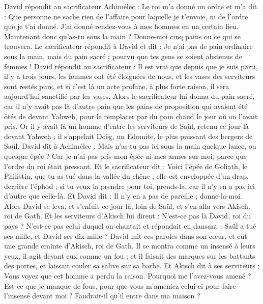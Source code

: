 \begin{multicols}{2}
David répondit au sacrificateur Achimélec : Le roi m'a donné un ordre et m'a dit : Que personne ne sache rien de l'affaire pour laquelle je t'envoie, ni de l’ordre que je t'ai donné. J’ai donné rendez-vous à mes hommes en un certain lieu.
Maintenant donc qu'as-tu sous la main ? Donne-moi cinq pains ou ce qui se trouvera.
Le sacrificateur répondit à David et dit : Je n'ai pas de pain ordinaire sous la main, mais du pain sacré ; pourvu que tes gens se soient abstenus de femmes !
David répondit au sacrificateur : Il est vrai que depuis que je suis parti, il y a trois jours, les femmes ont été éloignées de nous, et les vases des serviteurs sont restés purs, et si c’est là un acte profane, à plus forte raison, il sera aujourd’hui sanctifié par les vases.
Alors le sacrificateur lui donna du pain sacré, car il n'y avait pas là d'autre pain que les pains de proposition qui avaient été ôtés de devant Yahweh, pour le remplacer par du pain chaud le jour où on l’avait pris.
Or il y avait là un homme d'entre les serviteurs de Saül, retenu ce jour-là devant Yahweh ; il s’appelait Doëg, un Edomite, le plus puissant des bergers de Saül.
David dit à Achimélec : Mais n'as-tu pas ici sous la main quelque lance, ou quelque épée ? Car je n’ai pas pris mon épée ni mes armes sur moi, parce que l’ordre du roi était pressant.
Et le sacrificateur dit : Voici l'épée de Goliath, le Philistin, que tu as tué dans la vallée du chêne ; elle est enveloppée d'un drap, derrière l'éphod ; si tu veux la prendre pour toi, prends-la, car il n'y en a pas ici d'autre que celle-là. Et David dit : Il n'y en a pas de pareille ; donne-la-moi.
Alors David se leva, et s'enfuit ce jour-là, loin de Saül, et s'en alla vers Akisch, roi de Gath.
Et les serviteurs d'Akisch lui dirent : N'est-ce pas là David, roi du pays ? N’est-ce pas celui duquel on chantait et répondait en dansant : Saül a tué ses mille, et David ses dix mille ?
David mit ces paroles dans son cœur, et eut une grande crainte d'Akisch, roi de Gath.
Il se montra comme un insensé à leurs yeux, il agit devant eux comme un fou ; et il faisait des marques sur les battants des portes, et laissait couler sa salive sur sa barbe.
Et Akisch dit à ses serviteurs : Vous voyez que cet homme a perdu la raison. Pourquoi me l'avez-vous amené ?
Est-ce que je manque de fous, pour que vous m’ameniez celui-ci pour faire l'insensé devant moi ? Faudrait-il qu’il entre dans ma maison ?
\end{multicols}

